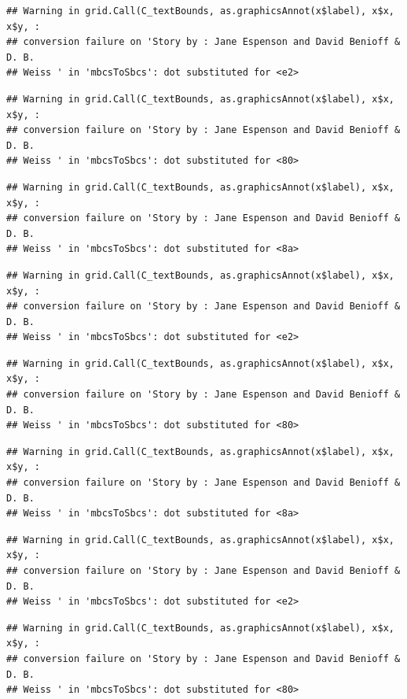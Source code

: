 \documentclass[]{article}
\begin{document}
\begin{verbatim}
## Warning in grid.Call(C_textBounds, as.graphicsAnnot(x$label), x$x, x$y, :
## conversion failure on 'Story by : Jane Espenson and David Benioff & D. B.
## Weiss ' in 'mbcsToSbcs': dot substituted for <e2>
\end{verbatim}

\begin{verbatim}
## Warning in grid.Call(C_textBounds, as.graphicsAnnot(x$label), x$x, x$y, :
## conversion failure on 'Story by : Jane Espenson and David Benioff & D. B.
## Weiss ' in 'mbcsToSbcs': dot substituted for <80>
\end{verbatim}

\begin{verbatim}
## Warning in grid.Call(C_textBounds, as.graphicsAnnot(x$label), x$x, x$y, :
## conversion failure on 'Story by : Jane Espenson and David Benioff & D. B.
## Weiss ' in 'mbcsToSbcs': dot substituted for <8a>
\end{verbatim}

\begin{verbatim}
## Warning in grid.Call(C_textBounds, as.graphicsAnnot(x$label), x$x, x$y, :
## conversion failure on 'Story by : Jane Espenson and David Benioff & D. B.
## Weiss ' in 'mbcsToSbcs': dot substituted for <e2>
\end{verbatim}

\begin{verbatim}
## Warning in grid.Call(C_textBounds, as.graphicsAnnot(x$label), x$x, x$y, :
## conversion failure on 'Story by : Jane Espenson and David Benioff & D. B.
## Weiss ' in 'mbcsToSbcs': dot substituted for <80>
\end{verbatim}

\begin{verbatim}
## Warning in grid.Call(C_textBounds, as.graphicsAnnot(x$label), x$x, x$y, :
## conversion failure on 'Story by : Jane Espenson and David Benioff & D. B.
## Weiss ' in 'mbcsToSbcs': dot substituted for <8a>
\end{verbatim}

\begin{verbatim}
## Warning in grid.Call(C_textBounds, as.graphicsAnnot(x$label), x$x, x$y, :
## conversion failure on 'Story by : Jane Espenson and David Benioff & D. B.
## Weiss ' in 'mbcsToSbcs': dot substituted for <e2>
\end{verbatim}

\begin{verbatim}
## Warning in grid.Call(C_textBounds, as.graphicsAnnot(x$label), x$x, x$y, :
## conversion failure on 'Story by : Jane Espenson and David Benioff & D. B.
## Weiss ' in 'mbcsToSbcs': dot substituted for <80>
\end{verbatim}
\end{document}
